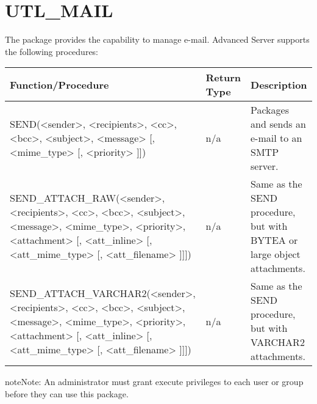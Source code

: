 \documentclass[letterpaper,10pt,english,openany,oneside]{sphinxmanual}
\begin{document}
\newpage


\section{UTL\_MAIL}
\label{\detokenize{utl_mail:utl-mail}}\label{\detokenize{utl_mail::doc}}
The  package provides the capability to manage e-mail. Advanced
Server supports the following procedures:


\begin{savenotes}\sphinxattablestart
\centering
\begin{tabulary}{\linewidth}[t]{|T|T|T|}
\hline

Function/Procedure
&
Return Type
&
Description
\\
\hline
SEND(\textless{}sender\textgreater{}, \textless{}recipients\textgreater{}, \textless{}cc\textgreater{}, \textless{}bcc\textgreater{}, \textless{}subject\textgreater{}, \textless{}message\textgreater{} {[}, \textless{}mime\_type\textgreater{} {[}, \textless{}priority\textgreater{} {]}{]})
&
n/a
&
Packages and sends an e-mail to an SMTP server.
\\
\hline
SEND\_ATTACH\_RAW(\textless{}sender\textgreater{}, \textless{}recipients\textgreater{}, \textless{}cc\textgreater{}, \textless{}bcc\textgreater{}, \textless{}subject\textgreater{}, \textless{}message\textgreater{}, \textless{}mime\_type\textgreater{}, \textless{}priority\textgreater{}, \textless{}attachment\textgreater{} {[}, \textless{}att\_inline\textgreater{} {[}, \textless{}att\_mime\_type\textgreater{} {[}, \textless{}att\_filename\textgreater{} {]}{]}{]})
&
n/a
&
Same as the SEND procedure, but with BYTEA or large object attachments.
\\
\hline
SEND\_ATTACH\_VARCHAR2(\textless{}sender\textgreater{}, \textless{}recipients\textgreater{}, \textless{}cc\textgreater{}, \textless{}bcc\textgreater{}, \textless{}subject\textgreater{}, \textless{}message\textgreater{}, \textless{}mime\_type\textgreater{}, \textless{}priority\textgreater{}, \textless{}attachment\textgreater{} {[}, \textless{}att\_inline\textgreater{} {[}, \textless{}att\_mime\_type\textgreater{} {[}, \textless{}att\_filename\textgreater{} {]}{]}{]})
&
n/a
&
Same as the SEND procedure, but with VARCHAR2 attachments.
\\
\hline
\end{tabulary}
\par
\sphinxattableend\end{savenotes}

\begin{sphinxadmonition}{note}{Note:}
An administrator must grant execute privileges to each user or group before they can use this package.
\end{sphinxadmonition}
\end{document}

